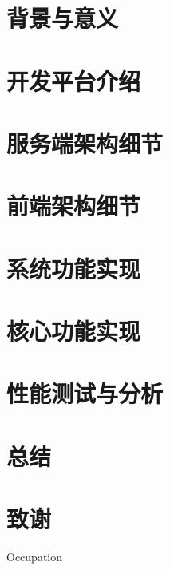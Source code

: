 \documentclass[11pt,a4paper]{article}
\begin{document}
\begin{CJK*}{UTF8}{gbsn}

\renewcommand{\abstractname}{摘要}
\newcommand{\HRule}{\rule{\linewidth}{0.5mm}}
\linespread{2.0}



\begin{abstract}
	
\end{abstract}

\section{背景与意义}


\section{开发平台介绍}


\section{服务端架构细节}


\section{前端架构细节}


\section{系统功能实现}


\section{核心功能实现}


\section{性能测试与分析}


\section{总结}


\section{致谢}
\indent
Occupation

\end{CJK*}
\end{document}
